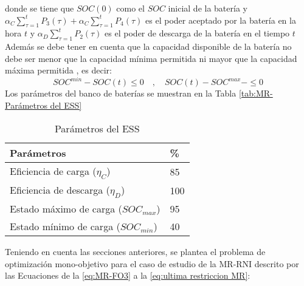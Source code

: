 \begin{itemize}
donde se tiene que $SOC(0)$ como el $SOC$ inicial de la batería y  $\alpha_C\sum_{\tau=1}^{t}P_3(\tau)+\alpha_C \sum_{\tau=1}^{t}P_4(\tau)$ es el poder aceptado por la batería en la hora $t$ y  $\alpha_D \sum_{\tau=1}^{t}P_2(\tau)$ es el poder de descarga de la batería en el tiempo $t$
Además se debe tener en cuenta que la capacidad disponible de la batería no debe ser menor que la capacidad mínima permitida ni mayor que la capacidad máxima permitida \cite{tazvinga2013minimum}, es decir:
\begin{equation}
SOC^{min}-SOC(t)\leq 0 \quad, \quad SOC(t)-SOC^{max}-\leq 0 
 \end{equation}
 Los parámetros del banco de baterías se muestran en la Tabla \ref{tab:MR-Parámetros del ESS}
\begin{table}[]
\centering
\begin{tabular}{ll}
\hline
 Parámetros &   \% \\ \hline
 Eficiencia de carga ($\eta_C$)  & 85 \\
 Eficiencia de descarga ($\eta_D$) & 100  \\
 Estado máximo de carga ($SOC_{max}$)& 95\\ 
 Estado mínimo de carga ($SOC_{min}$)& 40\\
 \hline
\end{tabular}
\caption{Parámetros del ESS}
\label{tab:MR-Parámetros del Sistemas de Almacenamiento de Energía (ESS)}
\end{table}

\end{itemize}
Teniendo en cuenta las secciones anteriores, se plantea el problema de optimización mono-objetivo para el caso de estudio de la MR-RNI descrito por las Ecuaciones de la \ref{eq:MR-FO3} a la \ref{eq:ultima restriccion MR}:


